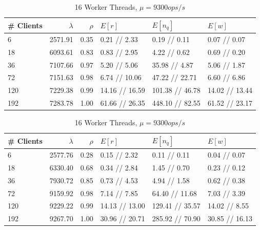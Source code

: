 \documentclass[11pt,a4paper]{article}
\begin{document}
\begin{table}
    \begin{subtable}{1.0\linewidth}\centering
        \begin{tabular}{lrrlll}
        \hline
        \# Clients &  $\lambda$&  $\rho$ & $E[r]$&        $E[n_q]$& $E[w]$\\
        \hline
          6 &    2571.91 &    0.35 &    0.21 // 2.33 &     0.19 // 0.11 &    0.07 // 0.07 \\
         18 &    6093.61 &    0.83 &    0.83 // 2.95 &     4.22 // 0.62 &    0.69 // 0.20 \\
         36 &    7107.66 &    0.97 &    5.20 // 5.06 &    35.98 // 4.87 &    5.06 // 1.87 \\
         72 &    7151.63 &    0.98 &   6.74 // 10.06 &   47.22 // 22.71 &    6.60 // 6.86 \\
        120 &    7229.38 &    0.99 &  14.16 // 16.59 &  101.38 // 46.78 &  14.02 // 13.44 \\
        192 &    7283.78 &    1.00 &  61.66 // 26.35 &  448.10 // 82.55 &  61.52 // 23.17 \\
        \hline
        \end{tabular}
        \caption{8 Worker Threads, $\mu = 7300 ops/s$}
    \end{subtable}
    \begin{subtable}{1.0\linewidth}\centering
        \begin{tabular}{lrrlll}
        \hline
        \# Clients &  $\lambda$&  $\rho$ & $E[r]$&        $E[n_q]$& $E[w]$\\
        \hline
          6 &    2577.76 &    0.28 &    0.15 // 2.32 &     0.11 // 0.11 &    0.04 // 0.07 \\
         18 &    6330.40 &    0.68 &    0.34 // 2.84 &     1.45 // 0.70 &    0.23 // 0.12 \\
         36 &    7930.72 &    0.85 &    0.73 // 4.53 &     4.94 // 1.58 &    0.62 // 0.38 \\
         72 &    9159.92 &    0.98 &    7.14 // 7.85 &   64.40 // 11.68 &    7.03 // 3.39 \\
        120 &    9229.22 &    0.99 &  14.13 // 13.00 &  129.41 // 35.57 &   14.02 // 8.55 \\
        192 &    9267.70 &    1.00 &  30.96 // 20.71 &  285.92 // 70.90 &  30.85 // 16.13 \\
        \hline
        \end{tabular}
        \caption{16 Worker Threads, $\mu = 9300 ops/s$}
    \end{subtable}
    

\end{table}
\end{document}
